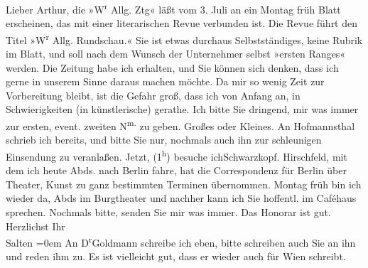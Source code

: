 \begin{ledgroupsized}[t]{13cm}
           \pstart{}Lieber Arthur,\pend\pstart
           die »W\textsuperscript{r} Allg. Ztg«
               läßt vom 3. Juli an ein Montag früh Blatt erscheinen, das mit einer
               literarischen Revue verbunden ist. Die Revue führt den Titel »W\textsuperscript{r} Allg. Rundschau.« Sie ist etwas durchaus
               Selbstständiges, keine Rubrik im Blatt, und soll nach dem Wunsch der Unternehmer
               selbst »ersten Ranges« werden. Die Zeitung habe ich erhalten, und Sie können sich
               denken, dass ich gerne in unserem Sinne daraus machen möchte. Da mir so wenig Zeit
               zur Vorbereitung bleibt, ist die Gefahr groß, dass ich von Anfang an, in
               Schwierigkeiten (in künstlerische) gerathe. Ich bitte Sie dringend, mir was immer zur
               ersten, event. zweiten N\textsuperscript{m.} zu geben. Großes oder Kleines.
               An Hofmannsthal schrieb ich bereits, und bitte Sie nur,
               nochmals auch ihn zur schleunigen Einsendung zu veranlaßen. Jetzt, (1\textsuperscript{h}) besuche ichSchwarzkopf. Hirschfeld, mit dem ich heute
               Abds. nach Berlin fahre, hat die Correspondenz
               für Berlin über Theater, Kunst zu ganz bestimmten
               Terminen übernommen. \pend
           \pstart
           Montag früh bin ich wieder da, Abds im Burgtheater und
               nachher kann ich Sie hoffentl. im Caféhaus sprechen. \pend
           \pstart
           Nochmals bitte, senden Sie mir was immer. Das Honorar ist gut. \pend
           \pstart
           Herzlichst Ihr {\\[\baselineskip]}\spacefill\mbox{Salten}\pend
           \leftskip=0em{}\pstart
           \noindent{}An D\textsuperscript{r}Goldmann schreibe ich eben, bitte schreiben
                  auch Sie an ihn und reden ihm zu. Es ist vielleicht gut, dass er wieder auch für
                     Wien schreibt. \pend
           
         
         \endnumbering{}\end{ledgroupsized}\begin{anhang}\end{anhang}\newcommand{\dateiname}{L03293}\newcommand{\titel}{Felix Salten an Arthur Schnitzler, 21. 6. 1899}\newcommand{\editorInnen}{Martin Anton Müller und Laura Untner}
      